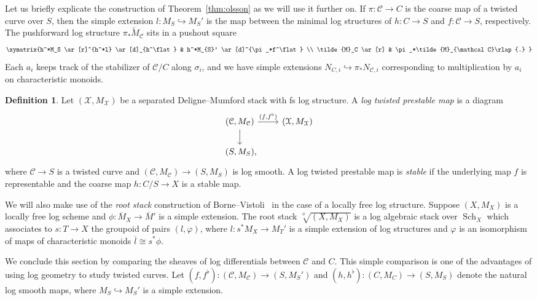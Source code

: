 \documentclass[11pt]{amsart}
\numberwithin{equation}{section}
\theoremstyle{definition}
\newtheorem{definition}[theorem]{Definition}
\theoremstyle{remark}
\newcommand{\calX}{\mathcal X}
\newcommand{\calC}{\mathcal C}
\begin{document}
Let us briefly explicate the construction of Theorem~\ref{thm:olsson} as we will use it further on. If $\pi \colon  \calC \to C$ is the coarse map of a twisted curve over $S$, then the simple extension $l \colon  M_S \hookrightarrow M_S'$ is the map between the minimal log structures of $h \colon  C \to S$ and $f \colon   \calC \to S$, respectively. The pushforward log structure $\pi_*\tilde{M}_\calC$ sits in a pushout square
$$
\xymatrix{h^*M_S \ar[r]^{h^*l} \ar[d]_{h^\flat} & h^*M_{S}' \ar[d]^{\pi_*f^\flat} \\ \tilde{M}_C \ar[r] & \pi_*\tilde{M}_{\calC}\rlap{.} }
$$
Each $a_i$ keeps track of the stabilizer of $\calC/C$ along $\sigma_i$, and we have simple extensions $N_{C, i} \hookrightarrow \pi_*N_{\calC, i}$ corresponding to multiplication by $a_i$ on characteristic monoids. 

\begin{definition} Let $(\calX, M_{\calX})$ be a separated Deligne--Mumford stack with fs log structure. A \emph{log twisted prestable map} is a diagram
\[ \begin{tikzcd}
(\calC, M_\calC) \arrow{r}{(f, f^\flat)}  \arrow{d} & (\calX, M_{\calX}) \\ 
  (S, M_S)\rlap{,}
\end{tikzcd} \]
where $\calC \to S$ is a twisted curve and $(\calC, M_{\calC}) \to (S, M_S)$ is log smooth. A log twisted prestable map is \emph{stable} if the underlying map $f$ is representable and the coarse map $h \colon  C/S \to X$ is a stable map. 
\end{definition}

We will also make use of the \emph{root stack} construction of Borne--Vistoli~\cite[Section 4.2]{bornevistoli} in the case of a locally free log structure. Suppose $(X,M_X)$ is a locally free log scheme and $\phi \colon  \overline{M}_X \to \overline{M}'$ is a simple extension. The root stack $\sqrt[\phi]{(X,M_X)}$ is a log algebraic stack over $\operatorname{Sch}_X$ 
which associates to $s \colon  T \to X$ the groupoid of pairs $(l, \varphi)$, where $l \colon  s^*M_X \to M_T'$ is a simple extension of log structures and $\varphi$ is an isomorphism of maps of characteristic monoids $\overline{l} \cong s^*\phi$. 

We conclude this section by comparing the sheaves of log differentials between $\calC$ and $C$. This simple comparison is one of the advantages of using log geometry to study twisted curves. Let $(f,f^\flat) \colon  (\calC, M_{\calC}) \to (S, M_S')$ and $(h, h^\flat) \colon  (C, M_C) \to (S, M_S)$ denote the natural log smooth maps, where $M_S \hookrightarrow M_S'$ is a simple extension. 
\end{document}
